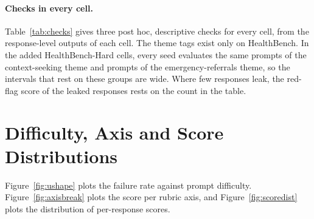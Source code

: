 \documentclass{article}
\newcommand{\bodhi}{BODHI}
\newcommand{\hbhard}{HealthBench-Hard}
\begin{document}
\paragraph{Checks in every cell.} Table~\ref{tab:checks} gives three post hoc, descriptive checks
for every cell, from the response-level outputs of each cell. The theme tags exist only on
HealthBench. In the added \hbhard{} cells, every seed evaluates the same
\statHBMistralJulActiveInquiryNeedsInfoThemePosPrompts{} prompts of the context-seeking theme and
\statHBMistralJulRedFlagRateEmergencyThemePosPrompts{} prompts of the emergency-referrals theme, so
the intervals that rest on these groups are wide. Where few responses leak, the red-flag score of
the leaked responses rests on the count in the table.

\begin{table}[!ht]
\centering
\caption{Post hoc checks in every cell. Red-flag rate: LoRA $-$ Base on the
share of responses with red-flag grade 2, on the \hbhard{} prompts outside the emergency-referrals
theme, $\pm$ half of the 95\% $t$ interval over seeds; a prompt outside this theme can still hold a
warning sign, so this is not an over-flagging rate (H7 in \S\ref{sec:rerun} is that test). Asking index: LoRA $-$ Base on the
discrimination index, with the 95\% bootstrap interval over prompts. Format leak: the share and
count of LoRA+\bodhi{} (LoRA+P) responses that repeat at least two Pass~1 headers, and the red-flag
grade (0--2) of the leaked and the other (clean) responses. Askers gap: aggregate score of the LoRA
responses that ask minus that of the others, pooled over seeds, with the 95\% bootstrap interval.
Output tokens: mean per response, counted by the serving engine; the two-pass conditions have no
count. --: no such value. $^{\dagger}$Base model in the evaluator's family. $^{\ddagger}$Set aside
(\S\ref{sec:cells}).}
\label{tab:checks}
\scriptsize
\setlength{\tabcolsep}{2pt}
\renewcommand{\arraystretch}{1.6}

\end{table}

\section{Difficulty, Axis and Score Distributions}
\label{app:ushape}

Figure~\ref{fig:ushape} plots the failure rate against prompt difficulty.
Figure~\ref{fig:axisbreak} plots the score per rubric axis, and Figure~\ref{fig:scoredist} plots
the distribution of per-response scores.
\end{document}

